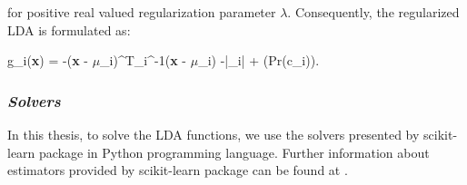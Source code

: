 for positive real valued regularization parameter $\lambda$. Consequently, the regularized LDA is formulated as:

\be
\label{eq:regularized_linear_disc_func}
g_{i}(\textbf{x}) = -(\textbf{x} - \textbf{$\mu$}_{i})^{T}{\widehat{\textbf{$\Sigma$}}_{i}}^{-1}(\textbf{x} - \textbf{$\mu$}_{i}) -\ln|\widehat{\textbf{$\Sigma$}}_{i}| + \ln(Pr(c_{i}))\:.
\ee

\subsubsection*{\textit{Solvers}}

In this thesis, to solve the LDA functions, we use the solvers presented by scikit-learn
package \cite{scikit-learn} in Python programming language. Further information about estimators provided by scikit-learn package can be found at \cite{scikit-learn_lda-solvers}.



